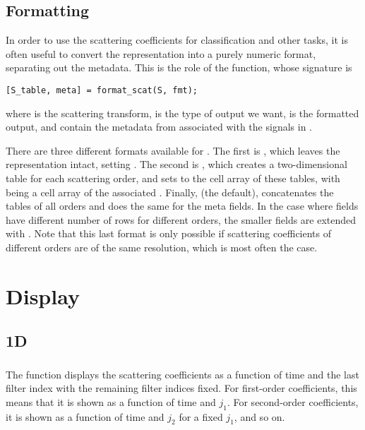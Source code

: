 \documentclass[twocolumn]{article}
\begin{document}
\subsection{Formatting}

In order to use the scattering coefficients for classification and other tasks, it is often useful to convert the representation into a purely numeric format, separating out the metadata. This is the role of the  function, whose signature is
\begin{lstlisting}
[S_table, meta] = format_scat(S, fmt);
\end{lstlisting}
where  is the scattering transform,  is the type of output we want,  is the formatted output, and  contain the metadata from  associated with the signals in .

There are three different formats available for . The first is , which leaves the representation intact, setting . The second is , which creates a two-dimensional table for each scattering order, and sets  to the cell array of these tables, with  being a cell array of the associated . Finally,  (the default), concatenates the tables of all orders and does the same for the meta fields. In the case where  fields have different number of rows for different orders, the smaller fields are extended with . Note that this last format is only possible if scattering coefficients of different orders are of the same resolution, which is most often the case.

\section{Display}

\subsection{1D}

\subsubsection{}

The  function displays the scattering coefficients as a function of time and the last filter index with the remaining filter indices fixed. For first-order coefficients, this means that it is shown as a function of time and $j_1$. For second-order coefficients, it is shown as a function of time and $j_2$ for a fixed $j_1$, and so on.
\end{document}
